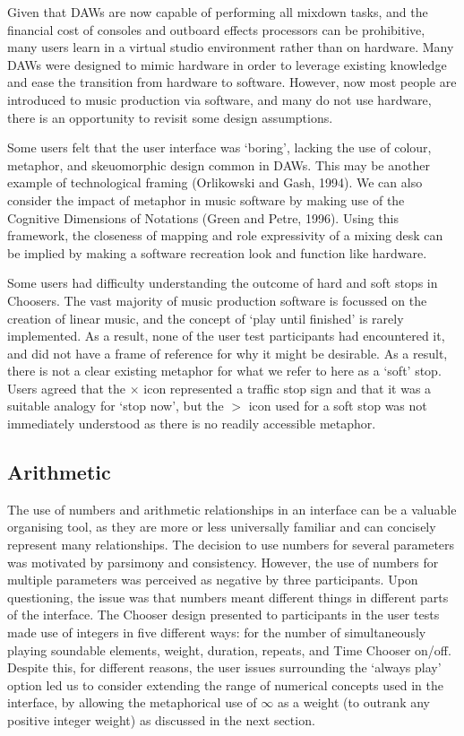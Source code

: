 \documentclass{ppig}
\begin{document}
Given that DAWs are now capable of performing all mixdown tasks, and the
financial cost of consoles and outboard effects processors can be
prohibitive, many users learn in a virtual studio environment rather
than on hardware. Many DAWs were designed to mimic hardware in order to
leverage existing knowledge and ease the transition from hardware to
software. However, now most people are introduced to music production
via software, and many do not use hardware, there is an opportunity to
revisit some design assumptions.

Some users felt that the user interface was `boring', lacking the use of
colour, metaphor, and skeuomorphic design common in DAWs. This may be
another example of technological framing (Orlikowski and Gash, 1994). We
can also consider the impact of metaphor in music software by making use
of the Cognitive Dimensions of Notations (Green and Petre, 1996). Using
this framework, the closeness of mapping and role expressivity of a
mixing desk can be implied by making a software recreation look and
function like hardware.

Some users had difficulty understanding the outcome of hard and soft
stops in Choosers. The vast majority of music production software is
focussed on the creation of linear music, and the concept of `play until
finished' is rarely implemented. As a result, none of the user test
participants had encountered it, and did not have a frame of reference
for why it might be desirable. As a result, there is not a clear
existing metaphor for what we refer to here as a `soft' stop. Users
agreed that the \(\times\) icon represented a traffic stop sign and that
it was a suitable analogy for `stop now', but the \(>\) icon used for a
soft stop was not immediately understood as there is no readily
accessible metaphor.

\hypertarget{sec:arithmetic}{%
\subsection{Arithmetic}\label{sec:arithmetic}}

The use of numbers and arithmetic relationships in an interface can be a
valuable organising tool, as they are more or less universally familiar
and can concisely represent many relationships. The decision to use
numbers for several parameters was motivated by parsimony and
consistency. However, the use of numbers for multiple parameters was
perceived as negative by three participants. Upon questioning, the issue
was that numbers meant different things in different parts of the
interface. The Chooser design presented to participants in the user
tests made use of integers in five different ways: for the number of
simultaneously playing soundable elements, weight, duration, repeats,
and Time Chooser on/off. Despite this, for different reasons, the user
issues surrounding the `always play' option led us to consider extending
the range of numerical concepts used in the interface, by allowing the
metaphorical use of \(\infty\) as a weight (to outrank any positive
integer weight) as discussed in the next section.
\end{document}
